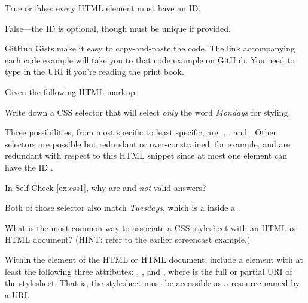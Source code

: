 \begin{checkyourself}
  True or false: every HTML element must have an ID.

  \begin{answer}
  False---the ID is optional, though must be unique if provided.
  \end{answer}
\end{checkyourself}

\begin{sidebar}[-0.5in]{GitHub Gists}
make it easy to copy-and-paste the code.
\ifhtmloutput
  The link accompanying each code example will take you to that code
  example on GitHub.
\else
  You need to type in the URI if you're reading the print book.
\fi
\end{sidebar}
%

\begin{checkyourself}
  \label{ex:css1}
  Given the following HTML markup:

  Write down a CSS selector that will select \emph{only} the word
  \emph{Mondays} for styling.
  \begin{answer}
  Three possibilities, from most specific to least specific, are:
  , , and .
  Other selectors are possible but redundant or over-constrained; for
  example,
   and 
  are redundant with respect to this HTML snippet since at
  most one element can have the ID .
  \end{answer}
\end{checkyourself}

\begin{checkyourself}
  In Self-Check \ref{ex:css1}, why are 
  and   \emph{not} valid answers?
  \begin{answer}
  Both of those selector also match \emph{Tuesdays}, which is a
   inside a .
  \end{answer}
\end{checkyourself}

\begin{checkyourself}
  What is the most common way to associate a CSS stylesheet with an HTML
  or HTML document? (HINT: refer to the earlier screencast example.)

  \begin{answer}
    Within the  element of the HTML or HTML document, include a
     element with at least the following three attributes:
    , ,
    and , where 
    is the full or partial URI of  the stylesheet.  That is, the
    stylesheet must be accessible as a resource named by a URI.
  \end{answer}
\end{checkyourself}
